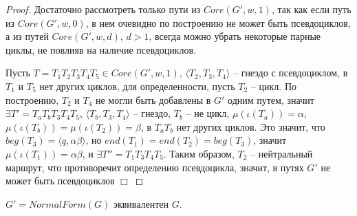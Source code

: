 \begin{proof}
    Достаточно рассмотреть только пути из $Core(G',w,1)$, так как если путь из $Core(G',w,0)$, в нем очевидно 
    по построению не может быть псевдоциклов, а из путей $Core(G',w,d)$, $d > 1$, всегда можно убрать
    некоторые парные циклы, не повлияв на наличие псевдоциклов.

    Пусть $T = T_1 T_2 T_3 T_4 T_5 \in Core(G',w,1)$, $\langle T_2, T_3, T_4 \rangle$ -- гнездо с псевдоциклом,
    в $T_1$ и $T_5$ нет других циклов,
    для определенности, пусть $T_2$ -- цикл.
    По построению, $T_2$ и $T_4$ не могли быть добавлены в $G'$ одним путем, значит 
    $\exists T' = T_a T_b T_3 T_4 T_5$, $\langle T_b, T_3, T_4 \rangle$ -- гнездо, $T_b$ -- не цикл,
    $\mu(\iota(T_a)) = \alpha$,
    $\mu(\iota(T_b)) = \mu(\iota(T_2)) = \beta$,
    в $T_a T_b$ нет других циклов.
    Это значит, что $beg(T_3) = \langle q, \alpha \beta \rangle$, но $end(T_1) = end(T_2) = beg(T_3)$,
    значит $\mu(\iota(T_1)) = \alpha \beta$, и $\exists T'' = T_1 T_3 T_4 T_5$.
    Таким образом, $T_2$ -- нейтральный маршрут, что противоречит определению псевдоцикла, 
    значит, в путях $G'$ не может быть псевдоциклов $\Box$ 
\end{proof}

\begin{theorem}
    $G' = NormalForm(G)$ эквивалентен $G$.
\end{theorem}

